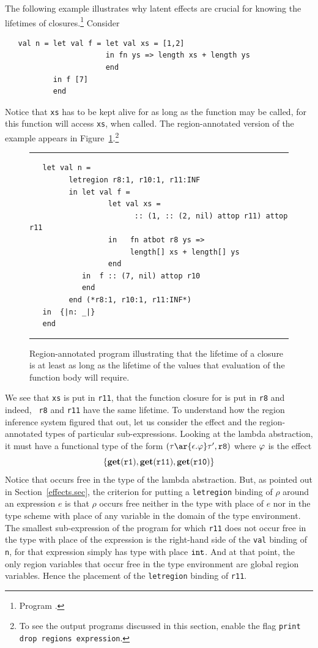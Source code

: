 \documentclass[12pt]{book}
\begin{document}
The following example illustrates why latent effects are crucial for
knowing the lifetimes of closures.\footnote{Program
  .} Consider
\begin{verbatim}
   val n = let val f = let val xs = [1,2]
                       in fn ys => length xs + length ys
                       end
           in f [7]
           end
\end{verbatim}
Notice that {\tt xs} has to be kept alive for as long as the function
 may be called, for this function will
access {\tt xs}, when called.  The region-annotated version of the
example appears in Figure~\ref{lambda1.fig}.\footnote{To see the
  output programs discussed in this section, enable the flag
  \texttt{print drop regions expression}.}
\begin{figure}
\hrule \medskip
\begin{verbatim}
   let val n = 
         letregion r8:1, r10:1, r11:INF 
         in let val f = 
                  let val xs = 
                        :: (1, :: (2, nil) attop r11) attop r11
                  in   fn atbot r8 ys => 
                       length[] xs + length[] ys
                  end 
            in  f :: (7, nil) attop r10
            end  
         end (*r8:1, r10:1, r11:INF*)
   in  {|n: _|}
   end 
\end{verbatim}
\caption{Region-annotated program illustrating that the lifetime of
  a closure is at least as long as the lifetime of the values that
  evaluation of the function body will require.}  \medskip \hrule
\label{lambda1.fig}
\end{figure}
We see that {\tt xs} is put in {\tt r11}, that the function closure
for  is put in {\tt r8} and indeed, {\tt
  r8} and {\tt r11} have the same lifetime. To understand how the
region inference system figured that out, let us consider the effect
and the region-annotated types of particular sub-expressions. Looking
at the lambda abstraction, it must have a functional type of the form
$(\tau\ar{\epsilon.\rea}\tau', {\tt r8})$ where $\varphi$ is the effect
$$\{\mathop{\bf get}\nolimits(\hbox{\tt r1}), \mathop{\bf get}\nolimits(\hbox{\tt r11}), \mathop{\bf get}\nolimits(\hbox{\tt r10})\}$$
Notice
that  occurs free in the type of the lambda abstraction.
But, as pointed out in Section~\ref{effects.sec}, the criterion
%
for putting a {\tt letregion} binding of $\rho$ around an expression
$e$ is that $\rho$ occurs free neither in the type with place of $e$
nor in the type scheme with place of any variable in the domain of the
type environment. The smallest sub-expression of the program for which
{\tt r11} does not occur free in the type with place of the expression
is the right-hand side of the {\tt val} binding of {\tt n}, for that
expression simply has type with place $\hbox{\tt int}$.  And at that
point, the only region variables that occur free in the type
environment are global region variables.  Hence the placement of the
{\tt letregion} binding of {\tt r11}.
\end{document}
